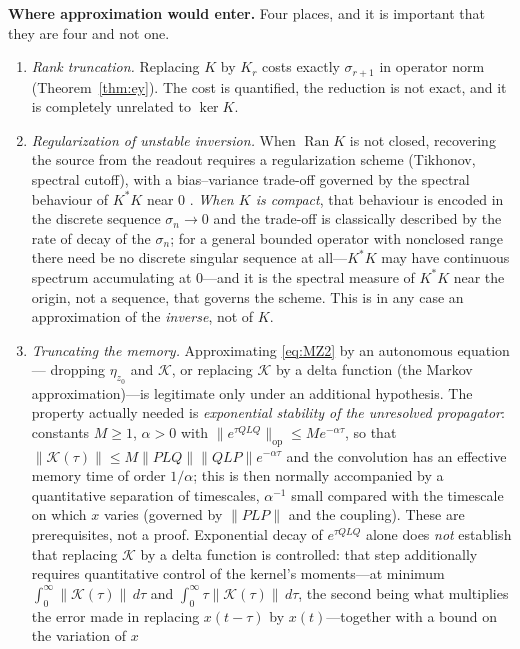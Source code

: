 \documentclass[11pt,reqno]{amsart}
\numberwithin{equation}{section}
\theoremstyle{plain}
\theoremstyle{definition}
\theoremstyle{remark}
\newcommand{\Ran}{\operatorname{Ran}}
\newcommand{\Kmem}{\mathcal{K}}
\begin{document}
\smallskip
\noindent\textbf{Where approximation would enter.} Four places, and it is important that they
are four and not one.
\begin{enumerate}
\item \emph{Rank truncation.} Replacing $K$ by $K_{r}$ costs exactly $\sigma_{r+1}$ in operator
norm (Theorem~\ref{thm:ey}). The cost is quantified, the reduction is not exact, and it is
completely unrelated to $\ker K$.
\item \emph{Regularization of unstable inversion.} When $\Ran K$ is not closed, recovering the
source from the readout requires a regularization scheme (Tikhonov, spectral cutoff), with a
bias--variance trade-off governed by the spectral behaviour of $K^{*}K$ near $0$
\cite{EnglHankeNeubauer}. \emph{When $K$ is compact}, that behaviour is encoded in the discrete
sequence $\sigma_{n}\to0$ and the trade-off is classically described by the rate of decay of the
$\sigma_{n}$; for a general bounded operator with nonclosed range there need be no discrete
singular sequence at all---$K^{*}K$ may have continuous spectrum accumulating at $0$---and it is
the spectral measure of $K^{*}K$ near the origin, not a sequence, that governs the scheme. This
is in any case an approximation of the \emph{inverse}, not of $K$.
\item \emph{Truncating the memory.} Approximating \eqref{eq:MZ2} by an autonomous equation---
dropping $\eta_{z_{0}}$ and $\Kmem$, or replacing $\Kmem$ by a delta function (the Markov
approximation)---is legitimate only under an additional hypothesis. The property actually
needed is \emph{exponential stability of the unresolved propagator}: constants $M\ge1$,
$\alpha>0$ with $\lVert e^{\tau QLQ}\rVert_{\mathrm{op}}\le M e^{-\alpha\tau}$, so that
$\lVert\Kmem(\tau)\rVert\le M\lVert PLQ\rVert\lVert QLP\rVert e^{-\alpha\tau}$ and the
convolution has an effective memory time of order $1/\alpha$; this is then normally accompanied
by a quantitative separation of timescales, $\alpha^{-1}$ small compared with the timescale on
which $x$ varies (governed by $\lVert PLP\rVert$ and the coupling). These are prerequisites,
not a proof. Exponential decay of $e^{\tau QLQ}$ alone does \emph{not} establish that replacing
$\Kmem$ by a delta function is controlled: that step additionally requires quantitative control
of the kernel's moments---at minimum $\int_{0}^{\infty}\lVert\Kmem(\tau)\rVert\,d\tau$ and
$\int_{0}^{\infty}\tau\lVert\Kmem(\tau)\rVert\,d\tau$, the second being what multiplies the
error made in replacing $x(t-\tau)$ by $x(t)$---together with a bound on the variation of $x$

\end{enumerate}
\end{document}
